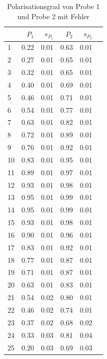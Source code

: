 \begin{center}
    \begin{table}
    \captionsetup{justification=centering,margin=2cm}
    \centering
    \begin{tabular}{lrrrrr}
        \toprule
        {} &  $P_1$ &   $s_{P_1}$ & $P_2$& $s_{P_2}$ \\
        \midrule
         1 &  0.22 &  0.01 &  0.63 &  0.01 \\
         2 &  0.27 &  0.01 &  0.65 &  0.01 \\
         3 &  0.32 &  0.01 &  0.65 &  0.01 \\
         4 &  0.40 &  0.01 &  0.69 &  0.01 \\
         5 &  0.46 &  0.01 &  0.71 &  0.01 \\
         6 &  0.54 &  0.01 &  0.77 &  0.01 \\
         7 &  0.63 &  0.01 &  0.82 &  0.01 \\
         8 &  0.72 &  0.01 &  0.89 &  0.01 \\
         9 &  0.76 &  0.01 &  0.92 &  0.01 \\
        10 &  0.83 &  0.01 &  0.95 &  0.01 \\
        11 &  0.89 &  0.01 &  0.97 &  0.01 \\
        12 &  0.93 &  0.01 &  0.98 &  0.01 \\
        13 &  0.95 &  0.01 &  0.99 &  0.01 \\
        14 &  0.95 &  0.01 &  0.99 &  0.01 \\
        15 &  0.93 &  0.01 &  0.98 &  0.01 \\
        16 &  0.90 &  0.01 &  0.96 &  0.01 \\
        17 &  0.83 &  0.01 &  0.92 &  0.01 \\
        18 &  0.77 &  0.01 &  0.87 &  0.01 \\
        19 &  0.71 &  0.01 &  0.87 &  0.01 \\
        20 &  0.63 &  0.01 &  0.83 &  0.01 \\
        21 &  0.54 &  0.02 &  0.80 &  0.01 \\
        22 &  0.46 &  0.02 &  0.74 &  0.01 \\
        23 &  0.37 &  0.02 &  0.68 &  0.02 \\
        24 &  0.33 &  0.03 &  0.81 &  0.04 \\
        25 &  0.20 &  0.03 &  0.69 &  0.03 \\
        \bottomrule
    \end{tabular}
    \caption{Polarisationsgrad von Probe 1 und Probe 2 mit Fehler} 
    \label{PolarisationsgradTabelle}  
    \end{table}     
\end{center}

